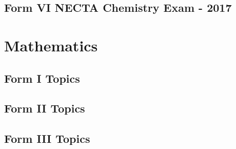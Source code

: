 \documentclass[pdftex,10pt,a4paper,twoside]{report}
\begin{document}
\section{Form VI NECTA Chemistry Exam - 2017}

\chapter{Mathematics}


\section{Form I Topics}










\section{Form II Topics}












\section{Form III Topics}








\end{document}
